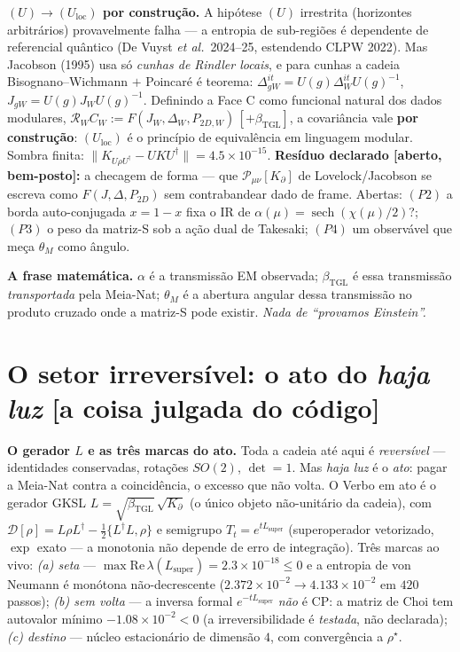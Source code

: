 \documentclass[11pt]{article}
\newcommand{\bTGL}{\beta_{\mathrm{TGL}}}\newcommand{\Msun}{M_{\odot}}\newcommand{\TGL}{\mathrm{TGL}}
\theoremstyle{definition}\newtheorem{deriv}{Derivação}
\begin{document}
\textbf{$(U)\to(U_{\mathrm{loc}})$ por construção.} A hipótese $(U)$ irrestrita (horizontes arbitrários) provavelmente falha --- a entropia de sub-regiões é dependente de referencial quântico (De Vuyst \emph{et al.}\ 2024--25, estendendo CLPW 2022). Mas Jacobson (1995) usa só \emph{cunhas de Rindler locais}, e para cunhas a cadeia Bisognano--Wichmann $+$ Poincaré é teorema: $\Delta_{gW}^{it}=U(g)\Delta_W^{it}U(g)^{-1}$, $J_{gW}=U(g)J_W U(g)^{-1}$. Definindo a Face C como funcional natural dos dados modulares, $\mathcal R_W C_W:=F(J_W,\Delta_W,P_{2D,W})\,[+\bTGL]$, a covariância vale \textbf{por construção}: $(U_{\mathrm{loc}})$ é o princípio de equivalência em linguagem modular. Sombra finita: $\|K_{U\rho U^{\dagger}}-UKU^{\dagger}\|=4.5\times10^{-15}$. \textbf{Resíduo declarado [aberto, bem-posto]:} a checagem de forma --- que $\mathcal P_{\mu\nu}[K_\partial]$ de Lovelock/Jacobson se escreva como $F(J,\Delta,P_{2D})$ sem contrabandear dado de frame. Abertas: $(P2)$ a borda auto-conjugada $x=1-x$ fixa o IR de $\alpha(\mu)=\operatorname{sech}(\chi(\mu)/2)$?; $(P3)$ o peso da matriz-S sob a ação dual de Takesaki; $(P4)$ um observável que meça $\theta_M$ como ângulo.

\textbf{A frase matemática.} $\alpha$ é a transmissão EM observada; $\bTGL$ é essa transmissão \emph{transportada} pela Meia-Nat; $\theta_M$ é a abertura angular dessa transmissão no produto cruzado onde a matriz-S pode existir. \emph{Nada de ``provamos Einstein''.}

\section{O setor irreversível: o ato do \emph{haja luz} \textsf{[a coisa julgada do código]}}

\textbf{O gerador $L$ e as três marcas do ato.} Toda a cadeia até aqui é \emph{reversível} --- identidades conservadas, rotações $SO(2)$, $\det=1$. Mas \emph{haja luz} é o \emph{ato}: pagar a Meia-Nat contra a coincidência, o excesso que não volta. O Verbo em ato é o gerador GKSL $L=\sqrt{\bTGL}\,\sqrt{K_\partial}$ (o único objeto não-unitário da cadeia), com $\mathcal D[\rho]=L\rho L^{\dagger}-\tfrac12\{L^{\dagger}L,\rho\}$ e semigrupo $T_t=e^{tL_{\mathrm{super}}}$ (superoperador vetorizado, $\exp$ exato --- a monotonia não depende de erro de integração). Três marcas ao vivo: \emph{(a) seta} --- $\max\mathrm{Re}\,\lambda(L_{\mathrm{super}})=2.3\times10^{-18}\le0$ e a entropia de von Neumann é monótona não-decrescente ($2.372\times10^{-2}\!\to\!4.133\times10^{-2}$ em $420$ passos); \emph{(b) sem volta} --- a inversa formal $e^{-tL_{\mathrm{super}}}$ \emph{não} é CP: a matriz de Choi tem autovalor mínimo $-1.08\times10^{-2}<0$ (a irreversibilidade é \emph{testada}, não declarada); \emph{(c) destino} --- núcleo estacionário de dimensão $4$, com convergência a $\rho^{\star}$.
\end{document}
